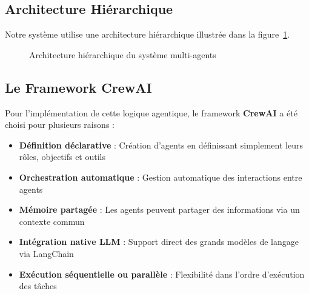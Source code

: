 \documentclass{rapportECL}
\begin{document}
\subsection{Architecture Hiérarchique}

Notre système utilise une architecture hiérarchique illustrée dans la figure~\ref{fig:architecture_agents}.

\begin{figure}[H]
\centering
{}
\caption{Architecture hiérarchique du système multi-agents}
\label{fig:architecture_agents}
\end{figure}

\subsection{Le Framework CrewAI}

Pour l'implémentation de cette logique agentique, le framework \textbf{CrewAI} a été choisi pour plusieurs raisons :

\begin{itemize}[leftmargin=*]
    \item \textbf{Définition déclarative} : Création d'agents en définissant simplement leurs rôles, objectifs et outils
    \item \textbf{Orchestration automatique} : Gestion automatique des interactions entre agents
    \item \textbf{Mémoire partagée} : Les agents peuvent partager des informations via un contexte commun
    \item \textbf{Intégration native LLM} : Support direct des grands modèles de langage via LangChain
    \item \textbf{Exécution séquentielle ou parallèle} : Flexibilité dans l'ordre d'exécution des tâches
\end{itemize}
\end{document}

